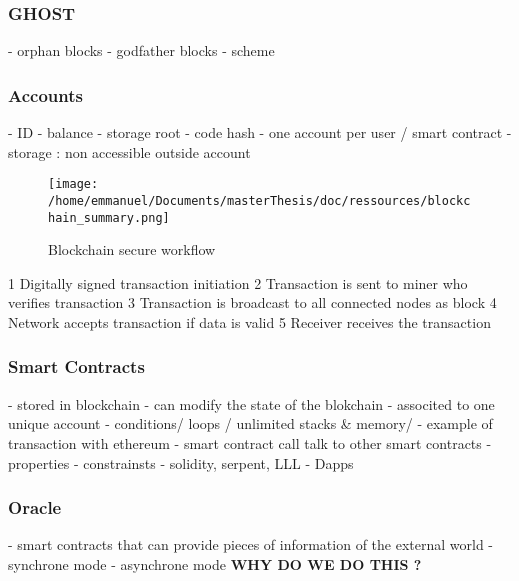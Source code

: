 \subsubsection{GHOST}
- orphan blocks
- godfather blocks
- scheme
 \subsubsection{Accounts}
 - ID
 \newline
 - balance
 \newline
 - storage root
 \newline
 - code hash
 \newline
 - one account per user / smart contract
 \newline
 - storage : non accessible outside account
 \newline
 \begin{figure}[htp]
\centering
\texttt{[image: /home/emmanuel/Documents/masterThesis/doc/ressources/blockchain\_summary.png]}
\caption{Blockchain secure workflow}
\label{}
\end{figure}
 1 	Digitally signed transaction initiation
2 	Transaction is sent to miner who verifies transaction
3 	Transaction is broadcast to all connected nodes as block
4 	Network accepts transaction if data is valid
5 	Receiver receives the transaction
  \subsubsection{Smart Contracts}
- stored in blockchain
\newline
- can modify the state of the blokchain
\newline
- associted to one unique account
\newline
- conditions/ loops / unlimited stacks \& memory/
\newline
- example of transaction with ethereum
\newline
- smart contract call talk to other smart contracts  
\newline
- properties 
- constrainsts
\newline
- solidity, serpent, LLL
\newline
- Dapps
\subsubsection{Oracle}
- smart contracts that can provide pieces of information of the external world
\newline
- synchrone mode
\newline
- asynchrone mode
\newline
\textbf{WHY DO WE DO THIS ?}


